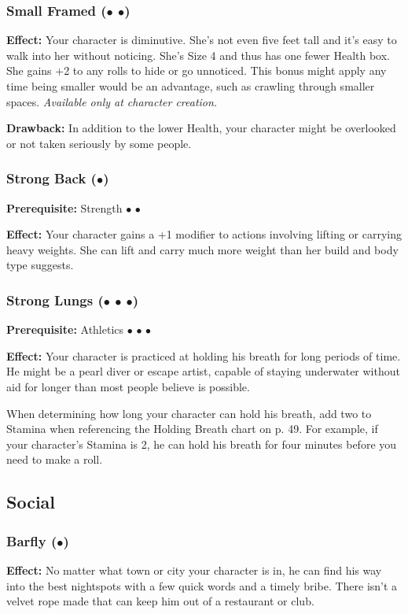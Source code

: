 \documentclass["../Misguided by Starlight.tex"]{subfiles}
\begin{document}
	\subsubsection{Small Framed ($\bullet$ $\bullet$)} %
		\textbf{Effect:} Your character is diminutive. She’s not even five feet tall and it’s easy to walk into her without noticing. She’s Size 4 and thus has one fewer Health box. She gains +2 to any rolls to hide or go unnoticed. This bonus might apply any time being smaller would be an advantage, such as crawling through smaller spaces. \emph{Available only at character creation.} 
		
		\textbf{Drawback:} In addition to the lower Health, your character might be overlooked or not taken seriously by some people.
	
	\subsubsection{Strong Back ($\bullet$)} %
		\textbf{Prerequisite:} Strength $\bullet$ $\bullet$
		
		\textbf{Effect:} Your character gains a +1 modifier to actions involving lifting or carrying heavy weights. She can lift and carry much more weight than her build and body type suggests.
	
	\subsubsection{Strong Lungs ($\bullet$ $\bullet$ $\bullet$)} %
		\textbf{Prerequisite:} Athletics $\bullet$ $\bullet$ $\bullet$
		
		\textbf{Effect:} Your character is practiced at holding his breath for long periods of time. He might be a pearl diver or escape artist, capable of staying underwater without aid for longer than most people believe is possible. 
		
		When determining how long your character can hold his breath, add two to Stamina when referencing the Holding Breath chart on p. 49. For example, if your character’s Stamina is 2, he can hold his breath for four minutes before you need to make a roll.
	
\subsection{Social}
	\subsubsection{Barfly ($\bullet$)} %
		\textbf{Effect:} No matter what town or city your character is in, he can find his way into the best nightspots with a few quick words and a timely bribe. There isn’t a velvet rope made that can keep him out of a restaurant or club.
	
\end{document}
